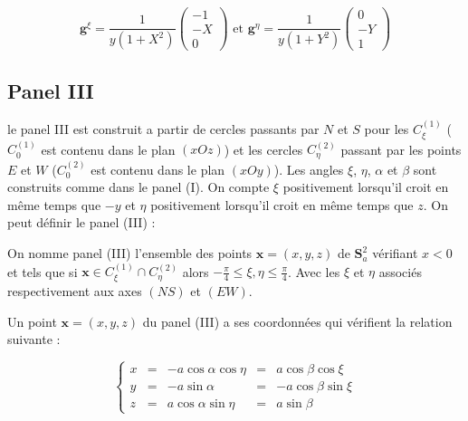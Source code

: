 \begin{equation}
\mathbf{g}^{\xi} = \dfrac{1}{y(1+X^2)}\begin{pmatrix}
-1 \\ -X \\ 0
\end{pmatrix} \text{ et } \mathbf{g}^{\eta} = \dfrac{1}{y(1+Y^2)}\begin{pmatrix}
0 \\ -Y \\ 1
\end{pmatrix}
\label{eq: base duale II}
\end{equation}














\subsection{Panel III}

le panel III est construit a partir de cercles passants par $N$ et $S$ pour les $C_{\xi}^{(1)}$ ($C_{0}^{(1)}$ est contenu dans le plan $(xOz)$) et les cercles $C_{\eta}^{(2)}$ passant par les points $E$ et $W$ ($C_{0}^{(2)}$ est contenu dans le plan $(xOy)$). Les angles $\xi$, $\eta$, $\alpha$ et $\beta$ sont construits comme dans le panel (I). On compte $\xi$ positivement lorsqu'il croit en même temps que $-y$ et $\eta$ positivement lorsqu'il croit en même temps que $z$.
On peut définir le panel (III) :

\begin{definition}
On nomme panel (III) l'ensemble des points $\mathbf{x}=(x,y,z)$ de $\mathbf{S}_a^2$ vérifiant $x<0$ et tels que si $\mathbf{x} \in C_{\xi}^{(1)} \cap C_{\eta}^{(2)}$ alors $-\frac{\pi}{4}\leq \xi,\eta \leq \frac{\pi}{4}$. Avec les $\xi$ et $\eta$ associés respectivement aux axes $(NS)$ et $(EW)$.
\end{definition}

Un point $\mathbf{x}=(x,y,z)$ du panel (III) a ses coordonnées qui vérifient la relation suivante :

\begin{equation}
\left\lbrace
\begin{array}{rcccc}
x & = & - a \cos \alpha \cos \eta & = & a \cos \beta \cos \xi \\
y & = & - a \sin \alpha & = & - a \cos \beta \sin \xi \\
z & = & a \cos \alpha \sin \eta & = & a \sin \beta
\end{array}
\right.
\end{equation}

